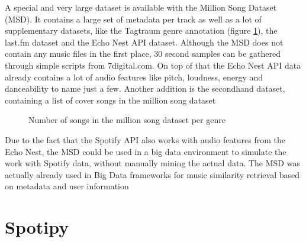 A special and very large dataset is available with the Million Song Dataset (MSD)\cite{msd1}. 
It contains a large set of metadata per track as well as a lot of supplementary datasets, like the Tagtraum genre annotation (figure \ref{msddist})\cite{msd5}, the last.fm dataset\cite{msd2} and the Echo Nest API dataset\cite{msd3}. Although the MSD does not contain any music files in the first place, 30 second samples can be gathered through simple scripts from 7digital.com.
On top of that the Echo Nest API data already contains a lot of audio features like pitch, loudness, energy and danceability to name just a few.
Another addition is the secondhand dataset, containing a list of cover songs in the million song dataset\cite{msd6}


\begin{figure}[thpb]
	\centering
	\caption{Number of songs in the million song dataset per genre}
	\label{msddist}
\end{figure}

Due to the fact that the Spotify API\cite{spotifyapi1} also works with audio features from the Echo Nest\cite{echonest1}, the MSD could be used in a big data environment to simulate the work with Spotify data, without manually mining the actual data.
The MSD was actually already used in Big Data frameworks for music similarity retrieval based on metadata and user information\cite{msd4}\\ 

\section{Spotipy}

